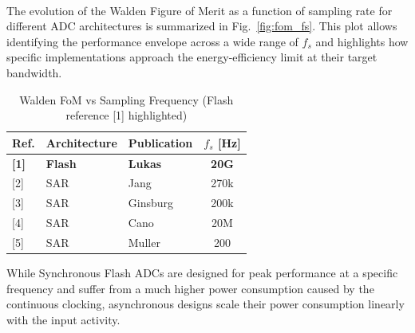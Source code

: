 \paragraph{}
\par\vspace{1.5em}
\par\vspace{1.5em}
\par\vspace{1.5em}
The evolution of the Walden Figure of Merit as a function of sampling rate for different ADC architectures is summarized in Fig.~\ref{fig:fom_fs}. This plot allows identifying the performance envelope across a wide range of $f_s$ and highlights how specific implementations approach the energy-efficiency limit at their target bandwidth.
\begin{table}[htbp]
\centering
\caption{Walden FoM vs Sampling Frequency (Flash reference [1] highlighted)}
\label{tab:fom_fs}
\begin{tabular}{lllc}
\toprule
\textbf{Ref.} & \textbf{Architecture} & \textbf{Publication} & \textbf{$f_s$ [Hz]} \\ \midrule
\textbf{[1]}  & \textbf{Flash}       & \textbf{Lukas \cite{Lukas_2014}} & \textbf{20G} \\
{} [2]        & SAR                  & Jang \cite{Jang_2018}            & 270k \\
{} [3]        & SAR                  & Ginsburg \cite{Ginsburg_2014}    & 200k \\
{} [4]        & SAR                  & Cano \cite{De_Cano_Garcia_2019}  & 20M  \\
{} [5]        & SAR                  & Muller \cite{Muller_2015}        & 200  \\ \bottomrule
\end{tabular}
\end{table}

\par\vspace{1.5em}
\par\vspace{1.5em}
\par\vspace{1.5em}


While Synchronous Flash ADCs are designed for peak performance at a specific frequency and suffer from a much higher power consumption caused by the continuous clocking, asynchronous designs scale their power consumption linearly with the input activity.

